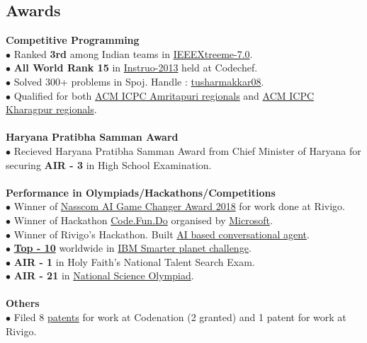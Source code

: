 \documentclass[margin,line]{resume}
\begin{document}
\begin{resume}
  \section{\mysidestyle \bf Awards}
  {\bf Competitive Programming } 
 \\$\bullet$ Ranked {\bfseries 3rd} among Indian teams in \href{http://www.ieee.org/membership_services/membership/students/competitions/xtreme/index.html}{IEEEXtreeme-7.0}.
    \\$\bullet$ {\bfseries All World Rank 15} in \href{http://www.codechef.com/rankings/INST2013/}{Instruo-2013} held at Codechef.
\\$\bullet$ Solved 300+ problems in Spoj. Handle :  \href{http://www.spoj.com/users/tusharmakkar08/}{tusharmakkar08}.
    \\$\bullet$ Qualified for both \href{icpc.amrita.ac.in}{ACM ICPC Amritapuri regionals} and \href{http://acm.iitkgp.ac.in/}{ACM ICPC Kharagpur regionals}.
\\\\    {\bf Haryana Pratibha Samman Award}
     \\$\bullet$ Recieved Haryana Pratibha Samman Award from Chief Minister of Haryana for securing {\bfseries AIR - 3} in High School Examination.
\\\\ {\bf Performance in Olympiads/Hackathons/Competitions}
    \\$\bullet$ Winner of \href{https://www.linkedin.com/feed/update/urn:li:activity:6425565017244037120/}{Nasscom AI Game Changer Award 2018} for work done at Rivigo.
     \\$\bullet$ Winner of Hackathon \href{https://www.acadaccelerator.com/Home/Events}{Code.Fun.Do} organised by \href{http://www.microsoft.com/en-in/msidc/default.aspx}{Microsoft}.
        \\$\bullet$ Winner of Rivigo's Hackathon. Built \href{https://eng.rivigo.com/technology/artificial-intelligence-based-conversational-agents/}{AI based conversational agent}.
    \\$\bullet$ \href{https://timesofindia.indiatimes.com/city/mangaluru/Mangalore-students-take-eco-literacy-online/articleshow/24455031.cms}{\bfseries{Top - 10}} worldwide in \href{http://www.ibm.com/ibm/history/ibm100/us/en/icons/smarterplanet/}{IBM Smarter planet challenge}.
\\$\bullet$ {\bfseries AIR - 1} in Holy Faith's National Talent Search Exam.
    \\$\bullet$ {\bfseries AIR - 21} in \href{http://www.sofworld.org/nso}{National Science Olympiad}.
    \\\\ {\bf Others}
\\$\bullet$ Filed 8 \href{https://patents.google.com/?inventor=Tushar+Makkar}{patents} for work at Codenation (2 granted) and 1 patent for work at Rivigo.


\end{resume}
\end{document}
